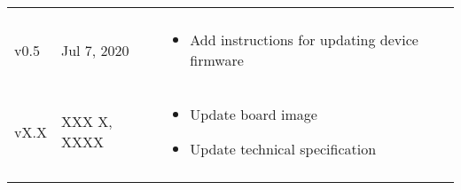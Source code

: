 \begin{longtable}{| >{\centering}p{} | p{} | >{\raggedright\arraybackslash}p{} |}
\begin{itemize}
        \end{itemize}\\
        v0.5 & Jul 7, 2020 &
        \begin{itemize}
			\item Add instructions for updating device firmware
        \end{itemize}\\
        vX.X & XXX X, XXXX &
        \begin{itemize}
			\item Update board image
			\item Update technical specification
        \end{itemize}\\
        \arrayrulecolor{gray!50}\hline
    \end{longtable}
\endgroup
